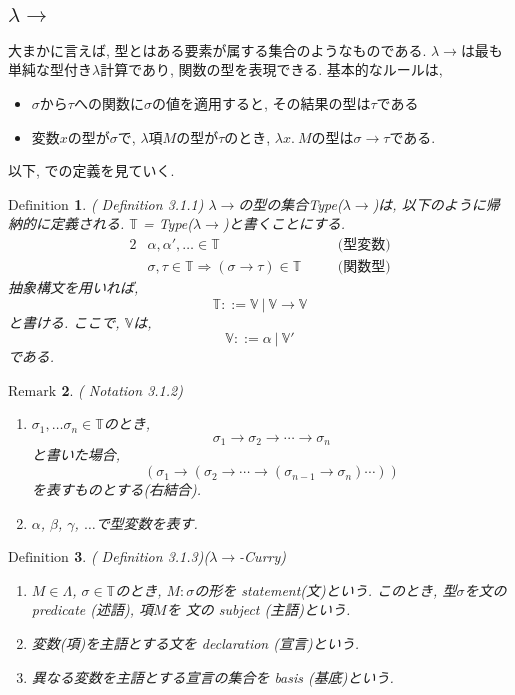 \documentclass[11pt]{jsreport}
\theoremstyle{mystyle}
\newtheorem{df}{$\textrm{Definition}$}[section]
\newtheorem{rmk}[df]{$\textrm{Remark}$}
\newcommand{\T}{\mathbb{T}}
\newcommand{\V}{\mathbb{V}}
\newcommand{\lama}{\lambda \! \! \to}
\newcommand{\0}{\textbf{0}}
\begin{document}
\subsection*{$\lama$}
大まかに言えば, 型とはある要素が属する集合のようなものである. 
$\lama$は最も単純な型付き$\lambda$計算であり, 関数の型を表現できる. 
基本的なルールは, 
\begin{itemize}
  \item $\sigma$から$\tau$への関数に$\sigma$の値を適用すると, 
    その結果の型は$\tau$である
  \item
    変数$x$の型が$\sigma$で, $\lambda$項$M$の型が$\tau$のとき, 
    $\lambda x.\ M$の型は$\sigma \to \tau$である. 
\end{itemize}
以下, \cite{Bar}での定義を見ていく. 
\begin{shadebox}
  \begin{df}{(\cite{Bar} Definition 3.1.1)}
    $\lama$の型の集合Type($\lama$)は, 以下のように帰納的に定義される. 
    $\T$ = Type($\lama$)と書くことにする. 
    \begin{alignat*}{2}
      &\alpha, \alpha',\ldots \in \T& &\text{(型変数)}\\
      &\sigma, \tau \in \T \Rightarrow (\sigma \to \tau) \in \T&  \quad &\text{(関数型)}
    \end{alignat*}
    抽象構文を用いれば, 
    \[
      \T ::= \V \ |\ \V \to \V
    \]
    と書ける. ここで, $\V$は, 
    \[
      \V ::= \alpha \ | \ \V'
    \]
    である.
  \end{df}
\end{shadebox}
\begin{rmk}{(\cite{Bar} Notation 3.1.2)}
  \begin{enumerate}
    \item $\sigma_{1}, \ldots \sigma_{n} \in \T$のとき, 
      \[
        \sigma_1 \to \sigma_2 \to \cdots \to \sigma_n
      \]
      と書いた場合, 
      \[
        (\sigma_1 \to (\sigma_2 \to \cdots \to (\sigma_{n-1} \to \sigma_n) \cdots ))
      \]
      を表すものとする(右結合).
    \item $\alpha$, $\beta$, $\gamma$, $\ldots$で型変数を表す. 
  \end{enumerate}
\end{rmk}
\begin{shadebox}
  \begin{df}{(\cite{Bar} Definition 3.1.3)}($\lama$-Curry)
    \begin{enumerate}
      \item $M \in \Lambda$, $\sigma \in \T$のとき, $M \colon \sigma$の形を
        statement(文)という. このとき, 型$\sigma$を文の predicate (述語), 項$M$を
        文の subject (主語)という. 
      \item 変数(項)を主語とする文を declaration (宣言)という.
      \item 異なる変数を主語とする宣言の集合を basis (基底)という.
    \end{enumerate}
  \end{df}
\end{shadebox}
\end{document}
